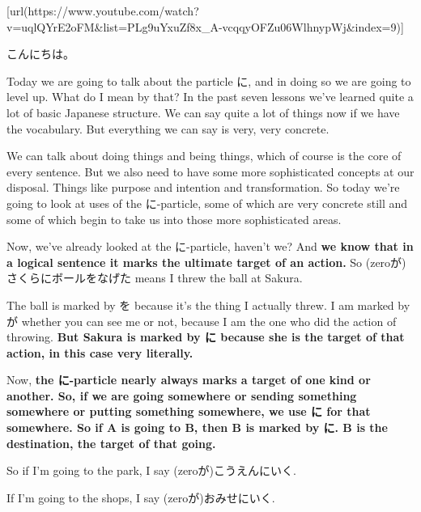 \startsectionlevel[title={{\bf 8. The に and へ particles}},reference={the-に-and-へ-particles}]

[url(https://www.youtube.com/watch?v=uqlQYrE2oFM&list=PLg9uYxuZf8x_A-vcqqyOFZu06WlhnypWj&index=9)]

\startsectionlevel[title={The に Particle},reference={the-に-particle}]

こんにちは。

Today we are going to talk about the particle に, and in doing so we are going to level up. What do I mean by that? In the past seven lessons we've learned quite a lot of basic Japanese structure. We can say quite a lot of things now if we have the vocabulary. But everything we can say is very, very concrete.

We can talk about doing things and being things, which of course is the core of every sentence. But we also need to have some more sophisticated concepts at our disposal. Things like purpose and intention and transformation. So today we're going to look at uses of the に-particle, some of which are very concrete still and some of which begin to take us into those more sophisticated areas.

{}

Now, we've already looked at the に-particle, haven't we? And {\bf we know that in a logical sentence it marks the ultimate target of an action.} So (zeroが)さくらにボールをなげた means I threw the ball at Sakura.

{}

The ball is marked by を because it's the thing I actually threw. I am marked by が whether you can see me or not, because I am the one who did the action of throwing. {\bf But Sakura is marked by に because she is the target of that action, in this case very literally.}

Now, {\bf the に-particle nearly always marks a target of one kind or another. So, if we are going somewhere or sending something somewhere or putting something somewhere, we use に for that somewhere. So if A is going to B, then B is marked by に. B is the destination, the target of that going.}

So if I'm going to the park, I say (zeroが)こうえんにいく.

{}

If I'm going to the shops, I say (zeroが)おみせにいく.

